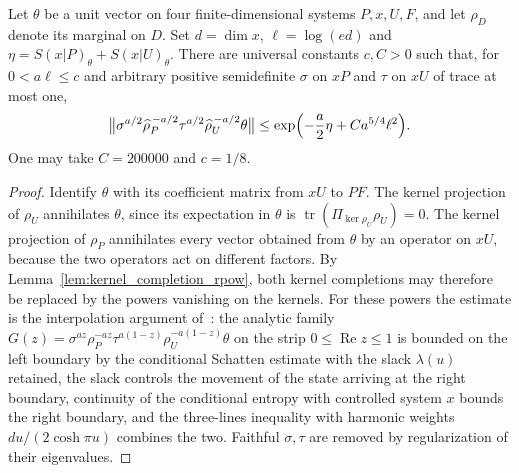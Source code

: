 \begin{theorem}
    \label{thm:conditional_movement}
    \leanok
    Let $\theta$ be a unit vector on four finite-dimensional systems
    $P,x,U,F$, and let $\rho_D$ denote its marginal on $D$. Set $d=\dim x$,
    $\ell=\log(ed)$ and $\eta=S(x|P)_\theta+S(x|U)_\theta$. There are
    universal constants $c,C>0$ such that, for $0<a\ell\le c$ and arbitrary
    positive semidefinite $\sigma$ on $xP$ and $\tau$ on $xU$ of trace at
    most one,
    \[
      \bigl\|\sigma^{a/2}\widehat\rho_P^{\,-a/2}
        \tau^{a/2}\widehat\rho_U^{\,-a/2}\theta\bigr\|
      \le\exp\Bigl(-\frac a2\eta+Ca^{5/4}\ell^2\Bigr).
    \]
    One may take $C=200000$ and $c=1/8$.
\end{theorem}

\begin{proof}\leanok
    Identify $\theta$ with its coefficient matrix from $xU$ to $PF$. The
    kernel projection of $\rho_U$ annihilates $\theta$, since its expectation
    in $\theta$ is $\operatorname{tr}(\Pi_{\ker\rho_U}\rho_U)=0$. The kernel
    projection of $\rho_P$ annihilates every vector obtained from $\theta$ by
    an operator on $xU$, because the two operators act on different factors.
    By Lemma~\ref{lem:kernel_completion_rpow}, both kernel completions may therefore be replaced
    by the powers vanishing on the kernels. For these powers the estimate is
    the interpolation argument of~\cite[proof of Lemma~5.1]{OpenAI2026AreaLaw}:
    the analytic family
    $G(z)=\sigma^{az}\rho_P^{-az}\tau^{a(1-z)}\rho_U^{-a(1-z)}\theta$ on the
    strip $0\le\operatorname{Re}z\le1$ is bounded on the left boundary by the
    conditional Schatten estimate with the slack $\lambda(u)$ retained, the
    slack controls the movement of the state arriving at the right boundary,
    continuity of the conditional entropy with controlled system $x$ bounds
    the right boundary, and the three-lines inequality with harmonic weights
    $du/(2\cosh\pi u)$ combines the two. Faithful $\sigma,\tau$ are removed
    by regularization of their eigenvalues.
\end{proof}
